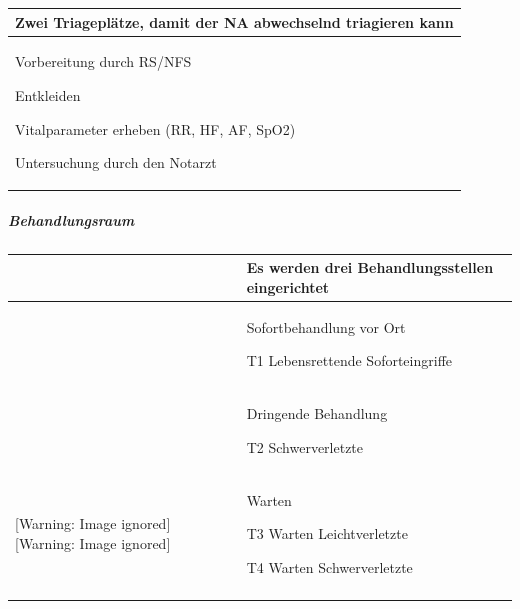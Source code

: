 \documentclass{article}
\begin{document}
\begin{center}
\begin{tabular}{|m{6.649cm}m{6.651cm}|}
\hline
\multicolumn{2}{|m{13.5cm}|}{\centering Zwei Triagepl\"atze, damit der
NA abwechselnd triagieren kann\par

}\\\hline
\multicolumn{1}{|m{6.649cm}|}{Vorbereitung durch RS/NFS

Entkleiden

Vitalparameter erheben (RR, HF, AF, SpO2)

Untersuchung durch den Notarzt

} &
\centering   [Warning: Image ignored]
 \par

\\\hline
\end{tabular}
\end{center}
\subparagraph[Behandlungsraum]{Behandlungsraum}
\begin{flushleft}
\begin{tabular}{|m{3.328cm}|m{5.406cm}m{4.36cm}}
\hline
  [Warning: Image ignored] %
 

 &
\multicolumn{2}{m{9.966001cm}|}{Es werden drei Behandlungsstellen
eingerichtet

}\\\hline
  [Warning: Image ignored] %
 

 &
\multicolumn{1}{m{5.406cm}|}{Sofortbehandlung vor Ort

T1 Lebensrettende Soforteingriffe

} &
\multicolumn{1}{m{4.36cm}|}{\centering   [Warning: Image ignored]
 \par

}\\\hline
  [Warning: Image ignored] %
 

 &
Dringende Behandlung

T2 Schwerverletzte

 &
\\\hhline{--~}
  [Warning: Image ignored] %
   [Warning: Image ignored] %
 

 &
Warten

T3 Warten Leichtverletzte

T4 Warten Schwerverletzte

 &
\\\hhline{--~}
\end{tabular}
\end{flushleft}
\end{document}

